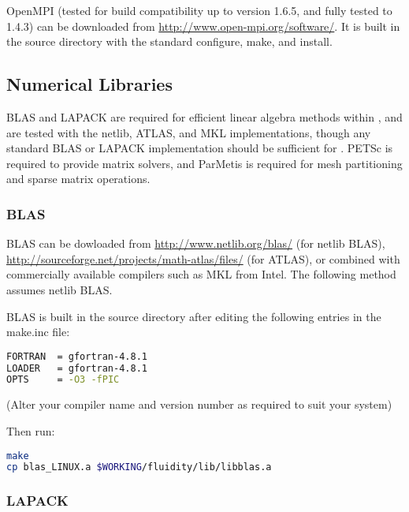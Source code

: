 OpenMPI (tested for \fluidity build compatibility up to version 1.6.5, and
fully tested to 1.4.3) can be downloaded from
\url{http://www.open-mpi.org/software/}. It is built in the source directory
with the standard configure, make, and install.

\subsection{Numerical Libraries}
\label{sec:required_libraries_numerical}

BLAS and LAPACK are required for efficient linear algebra methods within
\fluidity, and are tested with the netlib, ATLAS, and MKL implementations, though
any standard BLAS or LAPACK implementation should be sufficient for \fluidity.
PETSc is required to provide matrix solvers, and ParMetis is required for mesh
partitioning and sparse matrix operations.

\subsubsection{BLAS}
\label{sec:required_libraries_numerical_blas}

BLAS can be dowloaded from \url{http://www.netlib.org/blas/} (for netlib BLAS),
\url{http://sourceforge.net/projects/math-atlas/files/} (for ATLAS), or
combined with commercially available compilers such as MKL from Intel. The
following method assumes netlib BLAS.

BLAS is built in the source directory after editing the following entries in
the make.inc file:

\begin{lstlisting}[language=bash]
FORTRAN  = gfortran-4.8.1
LOADER   = gfortran-4.8.1
OPTS     = -O3 -fPIC
\end{lstlisting}

(Alter your compiler name and version number as required to suit your system)

Then run:

\begin{lstlisting}[language=bash]
make
cp blas_LINUX.a $WORKING/fluidity/lib/libblas.a
\end{lstlisting}

\subsubsection{LAPACK}
\label{sec:required_libraries_numerical_lapack}

